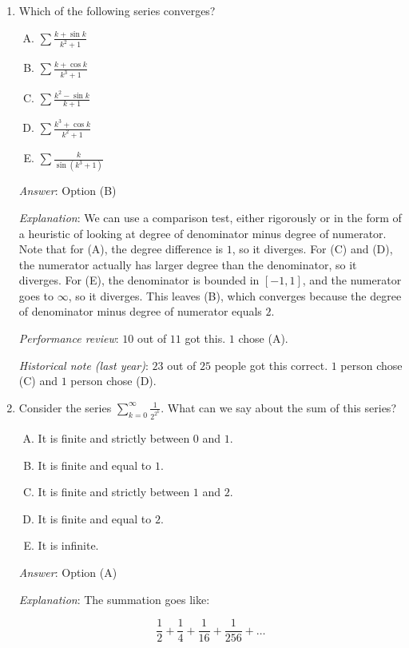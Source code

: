 \documentclass[10pt]{amsart}
\begin{document}
\begin{enumerate}
\item Which of the following series converges?

  \begin{enumerate}[(A)]
  \item $\sum \frac{k + \sin k}{k^2 + 1}$
  \item $\sum \frac{k + \cos k}{k^3 + 1}$
  \item $\sum \frac{k^2 - \sin k}{k + 1}$
  \item $\sum \frac{k^3 + \cos k}{k^2 + 1}$
  \item $\sum \frac{k}{\sin(k^3 + 1)}$
  \end{enumerate}

  {\em Answer}: Option (B)

  {\em Explanation}: We can use a comparison test, either rigorously
  or in the form of a heuristic of looking at degree of denominator
  minus degree of numerator. Note that for (A), the degree difference
  is $1$, so it diverges. For (C) and (D), the numerator actually has
  larger degree than the denominator, so it diverges. For (E), the
  denominator is bounded in $[-1,1]$, and the numerator goes to
  $\infty$, so it diverges. This leaves (B), which converges because
  the degree of denominator minus degree of numerator equals $2$.

  {\em Performance review}: $10$ out of $11$ got this. $1$ chose (A).

  {\em Historical note (last year)}: $23$ out of $25$ people got this
  correct. $1$ person chose (C) and $1$ person chose (D).

\item Consider the series $\sum_{k=0}^\infty \frac{1}{2^{2^k}}$. What
  can we say about the sum of this series?

  \begin{enumerate}[(A)]
  \item It is finite and strictly between $0$ and $1$.
  \item It is finite and equal to $1$.
  \item It is finite and strictly between $1$ and $2$.
  \item It is finite and equal to $2$.
  \item It is infinite.
  \end{enumerate}

  {\em Answer}: Option (A)

  {\em Explanation}: The summation goes like:

  $$\frac{1}{2} + \frac{1}{4} + \frac{1}{16} + \frac{1}{256} + \dots$$


\end{enumerate}
\end{document}
